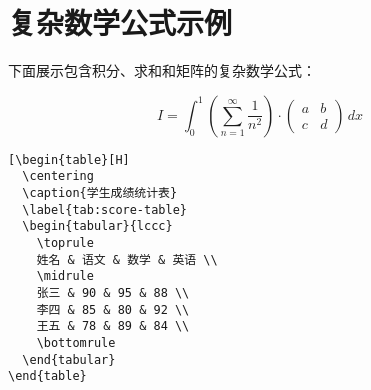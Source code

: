 %
%
% 
%
%
%
%
%
%
% 

\section{复杂数学公式示例}

下面展示包含积分、求和和矩阵的复杂数学公式：

\[
I = \int_{0}^{1} \left( \sum_{n=1}^{\infty} \frac{1}{n^2} \right) \cdot
\begin{pmatrix}
a & b \\
c & d
\end{pmatrix}
\, dx
\]

\begin{lstlisting}[\begin{table}[H]
  \centering
  \caption{学生成绩统计表}
  \label{tab:score-table}
  \begin{tabular}{lccc}
    \toprule
    姓名 & 语文 & 数学 & 英语 \\
    \midrule
    张三 & 90 & 95 & 88 \\
    李四 & 85 & 80 & 92 \\
    王五 & 78 & 89 & 84 \\
    \bottomrule
  \end{tabular}
\end{table}
\end{lstlisting}